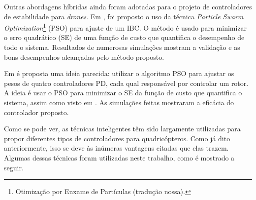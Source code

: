 %

Outras abordagens híbridas ainda foram adotadas para o projeto de controladores de estabilidade para \textit{drones}. Em \cite{Yacef2013}, foi proposto o uso da técnica \textit{Particle Swarm Optimization}\footnote{Otimização por Enxame de Partículas (tradução nossa).} (PSO) para ajuste de um IBC. O método é usado para minimizar o erro quadrático (SE) de uma função de custo que quantifica o desempenho de todo o sistema. Resultados de numerosas simulações mostram a validação e as bons desempenhos alcançadas pelo método proposto.

Em \cite{Boubertakh2013} é proposta uma ideia parecida: utilizar o algoritmo PSO para ajustar os pesos de quatro controladores PD, cada qual responsável por controlar um rotor. A ideia é usar o PSO para minimizar o SE da função de custo que quantifica o sistema, assim como visto em \cite{Yacef2013}. As simulações feitas mostraram a eficácia do controlador proposto.

Como se pode ver, as técnicas inteligentes têm sido largamente utilizadas para propor diferentes tipos de controladores para quadricópteros. Como já dito anteriormente, isso se deve às inúmeras vantagens citadas que elas trazem. Algumas dessas técnicas foram utilizadas neste trabalho, como é mostrado a seguir.